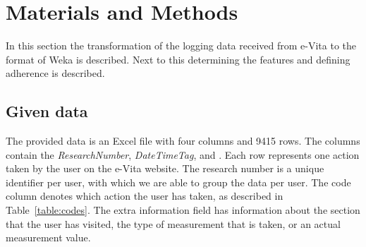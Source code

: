 \section{Materials and Methods} \label{section:materialsAndMethods}
In this section the transformation of the logging data received from e-Vita to the  format of Weka is described. Next to this determining the features and defining adherence is described.
\subsection{Given data} \label{subsection:givenData}
The provided data is an Excel file with four columns and 9415 rows. The columns contain the \emph{ResearchNumber}, \emph{DateTimeTag},  and . Each row represents one action taken by the user on the e-Vita website. The research number is a unique identifier per user, with which we are able to group the data per user. The code column denotes which action the user has taken, as described in Table~\ref{table:codes}. The extra information field has information about the section that the user has visited, the type of measurement that is taken, or an actual measurement value.

